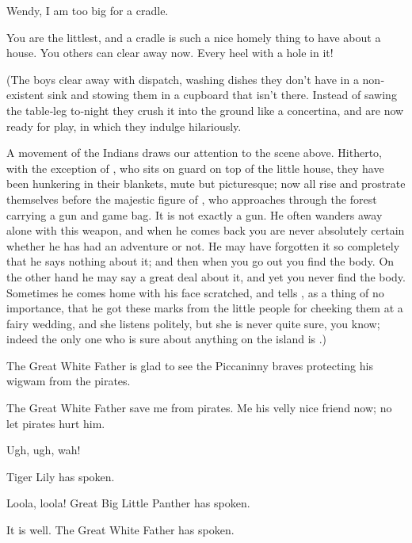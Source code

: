 \begin{drama}
\michaelspeaks
Wendy, I am too big for a cradle.

\wendyspeaks
You are the littlest, and a cradle is such a nice homely thing to have about a house.
You others can clear away now.
Every heel with a hole in it!

\begin{stagedir}
(The boys clear away with dispatch,
washing dishes they don’t have in a non‐existent sink and stowing them in a cupboard that isn’t there.
Instead of sawing the table‐leg to‐night they crush it into the ground like a concertina,
and are now ready for play, in which they indulge hilariously.

A movement of the Indians draws our attention to the scene above.
Hitherto, with the exception of \panther, who sits on guard on top of the little house,
they have been hunkering in their blankets, mute but picturesque;
now all rise and prostrate themselves before the majestic figure of \peter,
who approaches through the forest carrying a gun and game bag.
It is not exactly a gun.
He often wanders away alone with this weapon,
and when he comes back you are never absolutely certain whether he has had an adventure or not.
He may have forgotten it so completely that he says nothing about it;
and then when you go out you find the body.
On the other hand he may say a great deal about it, and yet you never find the body.
Sometimes he comes home with his face scratched,
and tells \wendy, as a thing of no importance,
that he got these marks from the little people for cheeking them at a fairy wedding,
and she listens politely, but she is never quite sure, you know;
indeed the only one who is sure about anything on the island is \peter.)
\end{stagedir}

\peterspeaks
The Great White Father is glad to see the Piccaninny braves protecting his wigwam from the pirates.

\tigerlilyspeaks
The Great White Father save me from pirates.
Me his velly nice friend now;
no let pirates hurt him.

Ugh, ugh, wah!

\tigerlilyspeaks
Tiger Lily has spoken.

\pantherspeaks
Loola, loola!
Great Big Little Panther has spoken.

\peterspeaks
It is well.
The Great White Father has spoken.



\end{drama}
